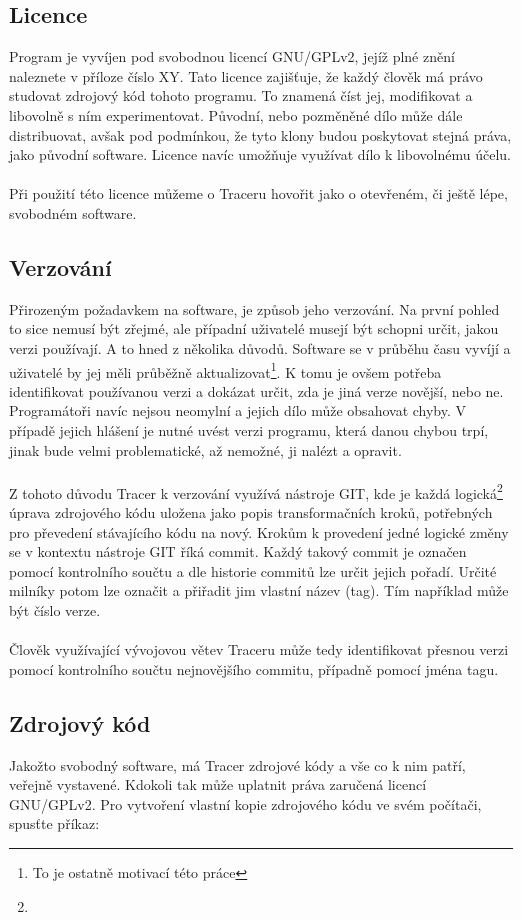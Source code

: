 \documentclass[
  field=inf,
  biblatex,
  glossaries,
  index
]{kidiplom}
\begin{document}
	\subsection{Licence}
	Program je vyvíjen pod svobodnou licencí GNU/GPLv2, jejíž plné znění naleznete v příloze číslo XY\@. Tato licence zajišťuje, že každý člověk má právo studovat zdrojový kód tohoto programu. To znamená číst jej, modifikovat a libovolně s ním experimentovat. Původní, nebo pozměněné dílo může dále distribuovat, avšak pod podmínkou, že tyto klony budou poskytovat stejná práva, jako původní software. Licence navíc umožňuje využívat dílo k libovolnému účelu.
	\\
	\\
	Při použití této licence můžeme o Traceru hovořit jako o otevřeném, či ještě lépe, svobodném software.

	\subsection{Verzování}
	Přirozeným požadavkem na software, je  způsob jeho verzování. Na první pohled to sice nemusí být zřejmé, ale případní uživatelé musejí být schopni určit, jakou verzi používají. A to hned z několika důvodů. Software se v průběhu času vyvíjí a uživatelé by jej měli průběžně aktualizovat\footnote{To je ostatně motivací této práce}. K tomu je ovšem potřeba identifikovat používanou verzi a dokázat určit, zda je jiná verze novější, nebo ne. Programátoři navíc nejsou neomylní a jejich dílo může obsahovat chyby. V případě jejich hlášení je nutné uvést verzi programu, která danou chybou trpí, jinak bude velmi problematické, až nemožné, ji nalézt a opravit.
	\\
	\\
	Z tohoto důvodu Tracer k verzování využívá nástroje GIT, kde je každá logická\footnote{} úprava zdrojového kódu uložena jako popis transformačních kroků, potřebných pro převedení stávajícího kódu na nový. Krokům k provedení jedné logické změny se v kontextu nástroje GIT říká commit. Každý takový commit je označen pomocí kontrolního součtu a dle historie commitů lze určit jejich pořadí. Určité milníky potom lze označit a přiřadit jim vlastní název (tag). Tím například může být číslo verze.
	\\
	\\
	Člověk využívající vývojovou větev Traceru může tedy identifikovat přesnou verzi pomocí kontrolního součtu nejnovějšího commitu, případně pomocí jména tagu.


	\subsection{Zdrojový kód}
	Jakožto svobodný software, má Tracer zdrojové kódy a vše co k nim patří, veřejně vystavené. Kdokoli tak může uplatnit práva zaručená licencí GNU/GPLv2. Pro vytvoření vlastní kopie zdrojového kódu ve svém počítači, spusťte příkaz:
\end{document}
